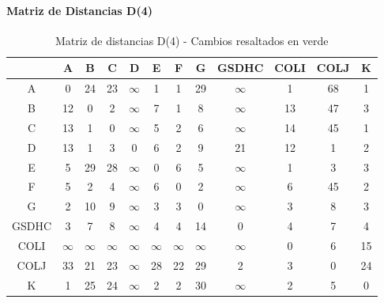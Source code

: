 \documentclass[12pt]{article}
\begin{document}
\paragraph{Matriz de Distancias D(4)}
\begin{table}[h!]
\centering
\begin{tabular}{|c|c|c|c|c|c|c|c|c|c|c|c|}
\hline
 & A & B & C & D & E & F & G & GSDHC & COLI & COLJ & K \\\hline
A & 0 & 24 & 23 & $\infty$ & 1 & 1 & 29 & $\infty$ & 1 & 68 & 1 \\\hline
B & 12 & 0 & 2 & $\infty$ & 7 & 1 & 8 & $\infty$ & 13 & 47 & 3 \\\hline
C & 13 & 1 & 0 & $\infty$ & 5 & 2 & 6 & $\infty$ & 14 & 45 & 1 \\\hline
D & 13 & 1 & 3 & 0 & 6 & 2 & 9 & 21 & 12 & 1 & 2 \\\hline
E & 5 & 29 & 28 & $\infty$ & 0 & 6 & 5 & $\infty$ & 1 & 3 & 3 \\\hline
F & 5 & 2 & 4 & $\infty$ & 6 & 0 & 2 & $\infty$ & 6 & 45 & 2 \\\hline
G & 2 & 10 & 9 & $\infty$ & 3 & 3 & 0 & $\infty$ & 3 & 8 & 3 \\\hline
GSDHC & 3 & 7 & 8 & $\infty$ & 4 & 4 & 14 & 0 & 4 & 7 & 4 \\\hline
COLI & $\infty$ & $\infty$ & $\infty$ & $\infty$ & $\infty$ & $\infty$ & $\infty$ & $\infty$ & 0 & 6 & 15 \\\hline
COLJ & 33 & 21 & 23 & $\infty$ & 28 & 22 & 29 & 2 & 3 & 0 & 24 \\\hline
K & 1 & 25 & 24 & $\infty$ & 2 & 2 & 30 & $\infty$ & 2 & 5 & 0 \\\hline
\end{tabular}
\caption{Matriz de distancias D(4) - Cambios resaltados en verde}
\end{table}
\end{document}
